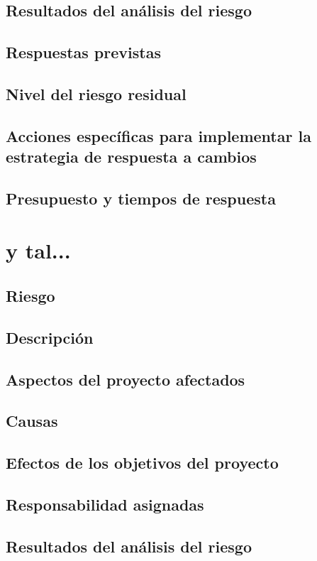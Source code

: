 \documentclass[11pt,a4paper,spanish,twoside]{report}
\begin{document}
\subsection{Resultados del análisis del riesgo}
\subsection{Respuestas previstas}
\subsection{Nivel del riesgo residual}
\subsection{Acciones específicas para implementar la estrategia de respuesta
a cambios}
\subsection{Presupuesto y tiempos de respuesta}

\section{y tal...}
\subsection{Riesgo}
\subsection{Descripción}
\subsection{Aspectos del proyecto afectados}
\subsection{Causas}
\subsection{Efectos de los objetivos del proyecto}
\subsection{Responsabilidad asignadas}
\subsection{Resultados del análisis del riesgo}
\end{document}
